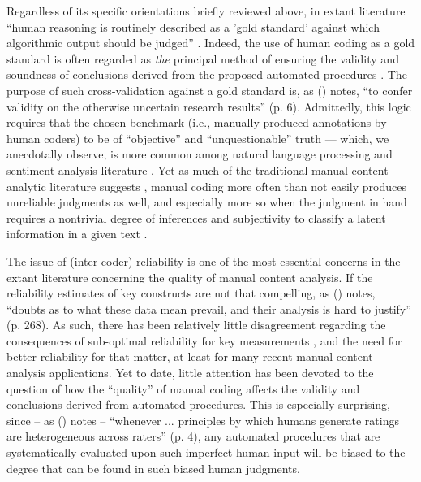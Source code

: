 \documentclass[man, 12pt, a4paper, nolmodern, noextraspace]{apa6}
\begin{document}
    Regardless of its specific orientations briefly reviewed above, in extant literature \enquote{human reasoning is routinely described as a 'gold standard' against which algorithmic output should be judged} \parencites[][p. 2]{dimaggio2015adapting}. Indeed, the use of human coding as a gold standard is often regarded as \textit{the} principal method of ensuring the validity and soundness of conclusions derived from the proposed automated procedures \parencites[e.g., ][]{grimmer2013text, lowe2013validating}. The purpose of such cross-validation against a gold standard is, as \citeauthor{Krippendorff2008validity} (\citeyear{Krippendorff2008validity}) notes, \enquote{to confer validity on the otherwise uncertain research results} (p. 6). Admittedly, this logic requires that the chosen benchmark (i.e., manually produced annotations by human coders) to be of \enquote{objective} and \enquote{unquestionable} truth --- which, we anecdotally observe, is more common among natural language processing and sentiment analysis literature \parencites[e.g.,][]{dimaggio2015adapting}. Yet as much of the traditional manual content-analytic literature suggests \parencites[][]{krippendorff2004reliability, hayes2007answering, lombard2002content, ennser2018impact}, manual coding more often than not easily produces unreliable judgments as well, and especially more so when the judgment in hand requires a nontrivial degree of inferences and subjectivity to classify a latent information in a given text \parencites[][]{riff2014analyzing, Krippendorff2013}.       
    
    The issue of (inter-coder) reliability is one of the most essential concerns in the extant literature concerning the quality of manual content analysis. If the reliability estimates of key constructs are not that compelling, as \citeauthor{Krippendorff2013} (\citeyear{Krippendorff2013}) notes, \enquote{doubts as to what these data mean prevail, and their analysis is hard to justify} (p. 268). As such, there has been relatively little disagreement regarding the consequences of sub-optimal reliability for key measurements \parencites[][]{krippendorff2004reliability, Krippendorff2013}, and the need for better reliability for that matter, at least for many recent manual content analysis applications. Yet to date, little attention has been devoted to the question of how the \enquote{quality} of manual coding affects the validity and conclusions derived from automated procedures. This is especially surprising, since -- as \citeauthor{dimaggio2015adapting} (\citeyear{dimaggio2015adapting}) notes -- \enquote{whenever ... principles by which humans generate ratings are heterogeneous across raters} (p. 4), any automated procedures that are systematically evaluated upon such imperfect human input will be biased to the degree that can be found in such biased human judgments. 
    
\end{document}
